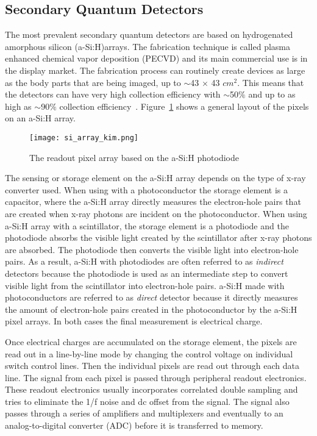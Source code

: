 \subsection{Secondary Quantum Detectors}
The most prevalent secondary quantum detectors are based on hydrogenated amorphous silicon (a-Si:H)arrays.  The fabrication technique is called plasma enhanced chemical vapor deposition (PECVD) and its main commercial use is in the display market.  The fabrication process can routinely create devices as large as the body parts that are being imaged, up to $\sim$43 $\times$ 43 $cm^2$.  This means that the detectors can have very high collection efficiency with $\sim$50$\%$ and up to as high as $\sim$90$\%$ collection efficiency~\citep{yorkston2007}.
Figure~\ref{fig:a-Si:H array} shows a general layout of the pixels on an a-Si:H array.  

\begin{figure}
\texttt{[image: si\_array\_kim.png]}
\caption{The readout pixel array based on the a-Si:H photodiode~\citep{Kim2008}}
\label{fig:a-Si:H array}
\end{figure}

The sensing or storage element on the a-Si:H array depends on the type of x-ray converter used.  When using with a photoconductor the storage element is a capacitor, where the a-Si:H array directly measures the electron-hole pairs that are created when x-ray photons are incident on the photoconductor.  When using a-Si:H array with a scintillator, the storage element is a photodiode and the photodiode absorbs the visible light created by the scintillator after x-ray photons are absorbed. The photodiode then converts the visible light into electron-hole pairs.  As a result, a-Si:H with photodiodes are often referred to as \textit{indirect} detectors because the photodiode is used as an intermediate step to convert visible light from the scintillator into electron-hole pairs.  a-Si:H made with photoconductors are referred to as \textit{direct} detector because it directly measures the amount of electron-hole pairs created in the photoconductor by the a-Si:H pixel arrays.  In both cases the final measurement is electrical charge.  

Once electrical charges are accumulated on the storage element, the pixels are read out in a line-by-line mode by changing the control voltage on individual switch control lines.  Then the individual pixels are read out through each data line.  The signal from each pixel is passed through peripheral readout electronics.  These readout electronics usually incorporates correlated double sampling and tries to eliminate the 1/f noise and dc offset from the signal.  The signal also passes through a series of amplifiers and multiplexers and eventually to an analog-to-digital converter (ADC) before it is transferred to memory.  

